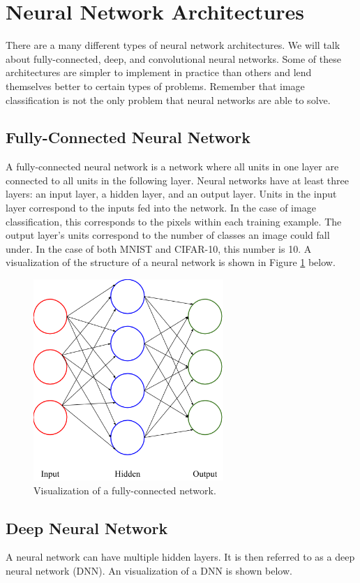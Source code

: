 \newpage
\section{Neural Network Architectures}\label{ch:neural_networks}
There are a many different types of neural network architectures. We will talk
about fully-connected, deep, and convolutional neural networks. Some of these
architectures are simpler to implement in practice than others and lend
themselves better to certain types of problems. Remember that image
classification is not the only problem that neural networks are able to solve.

\subsection{Fully-Connected Neural Network}
A fully-connected neural network is a network where all units in one layer are
connected to all units in the following layer. Neural networks have at least
three layers: an input layer, a hidden layer, and an output layer. Units in the
input layer correspond to the inputs fed into the network. In the case of image
classification, this corresponds to the pixels within each training example.
The output layer's units correspond to the number of classes an image could
fall under. In the case of both MNIST and CIFAR-10, this number is 10.
A visualization of the structure of a neural network is shown in Figure
\ref{fig:nn} below.

\begin{figure}[ht!]
\centering
\includegraphics[height=3in]{../figures/neural_network.png}
\caption{Visualization of a fully-connected network.}
\label{fig:nn}
\end{figure}

\subsection{Deep Neural Network}
A neural network can have multiple hidden layers. It is then referred to as a
deep neural network (DNN). An visualization of a DNN is shown below.

